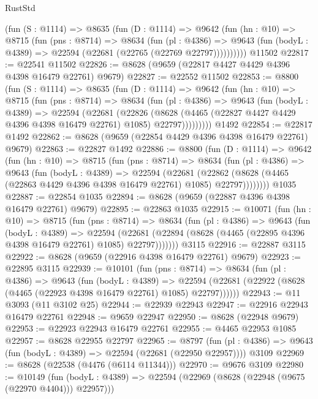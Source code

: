 \begin{lexlean}{RustStd}
\begin{coremodule}
      (fun (S : @1114) =>
      @8635
        (fun (D : @1114) =>
        @9642
          (fun (hn : @10) =>
          @8715
            (fun (pns : @8714) =>
            @8634
              (fun (pl : @4386) =>
              @9643 (fun (bodyL : @4389) => @22594 (@22681 (@22765 (@22769 @22797))))))))))
    @11502
@22817 := @22541 @11502
@22826 := @8628 (@9659 (@22817 @4427 @4429 @4396 @4398 @16479 @22761) @9679)
@22827 := @22552 @11502
@22853 := @8800
    (fun (S : @1114) =>
    @8635
      (fun (D : @1114) =>
      @9642
        (fun (hn : @10) =>
        @8715
          (fun (pns : @8714) =>
          @8634
            (fun (pl : @4386) =>
            @9643
              (fun (bodyL : @4389) =>
              @22594
                (@22681
                  (@22826
                    (@8628
                      (@4465 (@22827 @4427 @4429 @4396 @4398 @16479 @22761) @1085)
                      @22797)))))))))
    @1492
@22854 := @22817 @1492
@22862 := @8628 (@9659 (@22854 @4429 @4396 @4398 @16479 @22761) @9679)
@22863 := @22827 @1492
@22886 := @8800
    (fun (D : @1114) =>
    @9642
      (fun (hn : @10) =>
      @8715
        (fun (pns : @8714) =>
        @8634
          (fun (pl : @4386) =>
          @9643
            (fun (bodyL : @4389) =>
            @22594
              (@22681
                (@22862 (@8628 (@4465 (@22863 @4429 @4396 @4398 @16479 @22761) @1085) @22797))))))))
    @1035
@22887 := @22854 @1035
@22894 := @8628 (@9659 (@22887 @4396 @4398 @16479 @22761) @9679)
@22895 := @22863 @1035
@22915 := @10071
    (fun (hn : @10) =>
    @8715
      (fun (pns : @8714) =>
      @8634
        (fun (pl : @4386) =>
        @9643
          (fun (bodyL : @4389) =>
          @22594
            (@22681 (@22894 (@8628 (@4465 (@22895 @4396 @4398 @16479 @22761) @1085) @22797)))))))
    @3115
@22916 := @22887 @3115
@22922 := @8628 (@9659 (@22916 @4398 @16479 @22761) @9679)
@22923 := @22895 @3115
@22939 := @10101
    (fun (pns : @8714) =>
    @8634
      (fun (pl : @4386) =>
      @9643
        (fun (bodyL : @4389) =>
        @22594 (@22681 (@22922 (@8628 (@4465 (@22923 @4398 @16479 @22761) @1085) @22797))))))
@22943 := @11 @3093 (@11 @3102 @25)
@22944 := @22939 @22943
@22947 := @22916 @22943 @16479 @22761
@22948 := @9659 @22947
@22950 := @8628 (@22948 @9679)
@22953 := @22923 @22943 @16479 @22761
@22955 := @4465 @22953 @1085
@22957 := @8628 @22955 @22797
@22965 := @8797
    (fun (pl : @4386) => @9643 (fun (bodyL : @4389) => @22594 (@22681 (@22950 @22957))))
    @3109
@22969 := @8628 (@22538 (@4476 (@6114 @11344)))
@22970 := @9676 @3109
@22980 := @10149
    (fun (bodyL : @4389) => @22594 (@22969 (@8628 (@22948 (@9675 (@22970 @4404))) @22957)))

\end{coremodule}
\end{lexlean}
